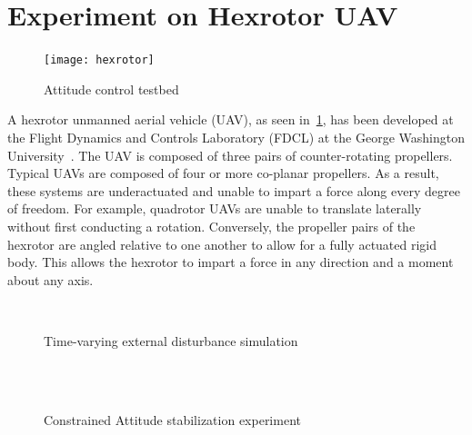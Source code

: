 \section{Experiment on Hexrotor UAV}\label{sec:experiment}
\vspace{-5mm}
\begin{figure}[H]
    \centering
    \texttt{[image: hexrotor]}
    \caption{Attitude control testbed~\label{fig:hexrotor}}
\end{figure}
\vspace{-3mm}
A hexrotor unmanned aerial vehicle (UAV), as seen in~\cref{fig:hexrotor}, has been developed at the Flight Dynamics and Controls Laboratory (FDCL) at the George Washington University~\cite{kaufman2014}.
The UAV is composed of three pairs of counter-rotating propellers. 
Typical UAVs are composed of four or more co-planar propellers.
As a result, these systems are underactuated and unable to impart a force along every degree of freedom.
For example, quadrotor UAVs are unable to translate laterally without first conducting a rotation.
Conversely, the propeller pairs of the hexrotor are angled relative to one another to allow for a fully actuated rigid body.
This allows the hexrotor to impart a force in any direction and a moment about any axis. 
\begin{figure}[H]
    \centering 
    ~
    ~
    \caption{Time-varying external disturbance simulation}
    \label{fig:tv} 
\end{figure}
\begin{figure}[t]
    \centering 
    ~
    ~
    \\
    ~
    \caption{Constrained Attitude stabilization experiment}
    \label{fig:exp} 
\end{figure}
